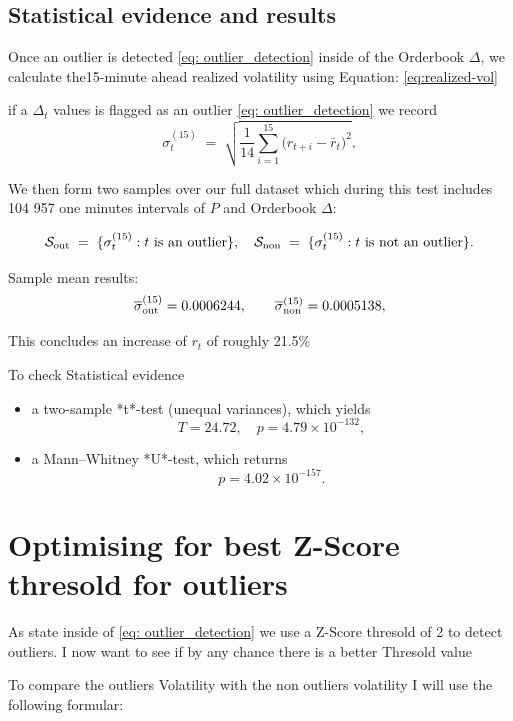 \documentclass[12pt]{article}
\begin{document}
\newpage

\subsection{Statistical evidence and results}

Once an outlier is detected \eqref{eq: outlier_detection} inside of the Orderbook $\Delta$, we calculate the15-minute ahead realized volatility using Equation: \eqref{eq:realized-vol}




if a $\Delta_t$ values is flagged as an outlier \eqref{eq: outlier_detection}
we record
$$
\sigma^{(15)}_t
\;=\;
\sqrt{\frac{1}{14}\sum_{i=1}^{15}\bigl(r_{t+i}-\bar r_{t}\bigr)^{2}},
$$

We then form two samples over our full dataset which during this test includes 104 957 one minutes intervals of $P$ and Orderbook $\Delta$:


$$
\mathcal{S}_{\rm out} \;=\;\{\sigma^{(15)}_t : t\text{ is an outlier}\},
\quad
\mathcal{S}_{\rm non} \;=\;\{\sigma^{(15)}_t : t\text{ is not an outlier}\}.
$$


Sample mean results:
$$
\overline{\sigma}^{(15)}_{\rm out}
=0.0006244,
\qquad
\overline{\sigma}^{(15)}_{\rm non}
=0.0005138,
$$




This concludes an increase of $r_t$ of roughly 21.5\%


To check Statistical evidence

\begin{itemize}
  \item a two-sample *t*-test (unequal variances), which yields
  $$
    T=24.72,\quad p=4.79\times10^{-132},
  $$
  \item a Mann–Whitney *U*-test, which returns
  $$
    p=4.02\times10^{-157}.
  $$
\end{itemize}


\newpage

\section{Optimising for best Z-Score thresold for outliers}

As state inside of \eqref{eq: outlier_detection} we use a Z-Score thresold of 2 to detect outliers. I now want to 
see if by any chance there is a better Thresold value  

To compare the outliers Volatility with the non outliers volatility I will use the following formular:
\end{document}
